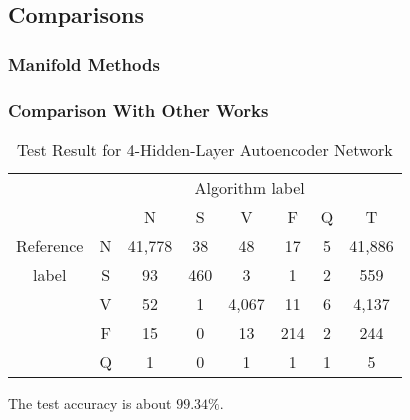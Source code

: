 \documentclass[journal]{IEEEtran}
\begin{document}
\subsection{Comparisons}
\subsubsection{Manifold Methods}

\lipsum[1]

\subsubsection{Comparison With Other Works}
\lipsum[1]

\begin{table}[!htbp]
\begin{center}
\begin{threeparttable}
\caption{Test Result for 4-Hidden-Layer Autoencoder Network}
\label{table7}
\begin{tabular}{cccccccc}
\hline
\multicolumn{6}{r}{Algorithm label} \\
\cline{3-7}
		&  & N & S      & V    & F     & Q   & T\\
\hline
 Reference & N & 41,778 &  38  &  48   & 17  & 5  &  41,886 \\
	label  & S &  93    & 460  &   3   & 1   & 2  &  559\\
		   & V &  52    & 1    & 4,067 & 11  & 6  &  4,137\\
		   & F &  15    & 0    & 13    & 214 & 2  &  244\\
		   & Q &  1     & 0    & 1     & 1   & 1  &  5\\
\hline
\end{tabular}
\begin{tablenotes}
\item The test accuracy is about $99.34\%$.
\end{tablenotes}
\end{threeparttable}
\end{center}
\end{table}
\end{document}
